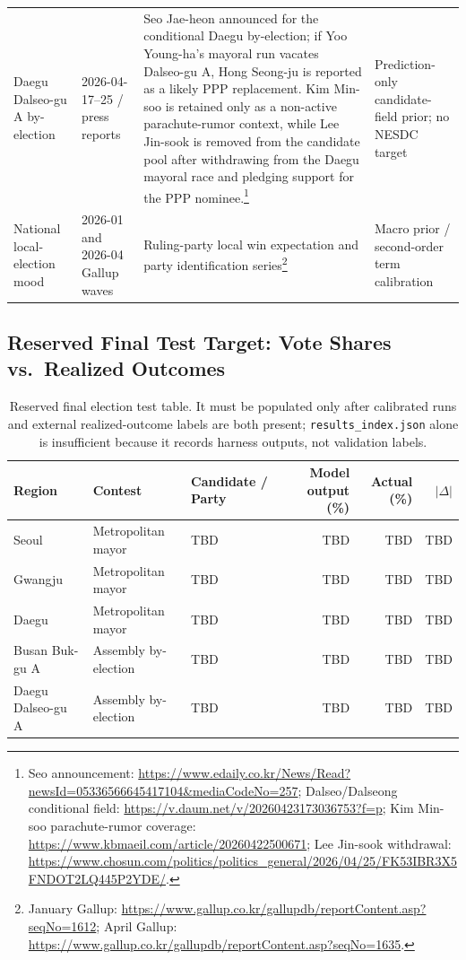 \documentclass[11pt]{article}
\begin{document}
\begin{table}[h]
\begin{tabularx}{\textwidth}{L{0.18\textwidth}L{0.18\textwidth}YL{0.16\textwidth}}
Daegu Dalseo-gu A by-election & 2026-04-17--25 / press reports & Seo Jae-heon announced for the conditional Daegu by-election; if Yoo Young-ha's mayoral run vacates Dalseo-gu A, Hong Seong-ju is reported as a likely PPP replacement. Kim Min-soo is retained only as a non-active parachute-rumor context, while Lee Jin-sook is removed from the candidate pool after withdrawing from the Daegu mayoral race and pledging support for the PPP nominee.\footnote{Seo announcement: \url{https://www.edaily.co.kr/News/Read?newsId=05336566645417104&mediaCodeNo=257}; Dalseo/Dalseong conditional field: \url{https://v.daum.net/v/20260423173036753?f=p}; Kim Min-soo parachute-rumor coverage: \url{https://www.kbmaeil.com/article/20260422500671}; Lee Jin-sook withdrawal: \url{https://www.chosun.com/politics/politics_general/2026/04/25/FK53IBR3X5FNDOT2LQ445P2YDE/}.} & Prediction-only candidate-field prior; no NESDC target \\
National local-election mood & 2026-01 and 2026-04 Gallup waves & Ruling-party local win expectation and party identification series\footnote{January Gallup: \url{https://www.gallup.co.kr/gallupdb/reportContent.asp?seqNo=1612}; April Gallup: \url{https://www.gallup.co.kr/gallupdb/reportContent.asp?seqNo=1635}.} & Macro prior / second-order term calibration \\
\bottomrule
\end{tabularx}
\end{table}

\subsection{Reserved Final Test Target: Vote Shares vs.\ Realized Outcomes}

\begin{table}[h]
\centering
\caption{Reserved final election test table. It must be populated only after calibrated runs and external realized-outcome labels are both present; \texttt{results\_index.json} alone is insufficient because it records harness outputs, not validation labels.}
\label{tab:results-vote-share}
\footnotesize
\setlength{\tabcolsep}{3pt}
\begin{tabularx}{\textwidth}{L{0.15\textwidth}L{0.18\textwidth}Yrrr}
\toprule
Region & Contest & Candidate / Party & Model output (\%) & Actual (\%) & $|\Delta|$ \\
\midrule
Seoul & Metropolitan mayor & TBD & TBD & TBD & TBD \\
Gwangju & Metropolitan mayor & TBD & TBD & TBD & TBD \\
Daegu & Metropolitan mayor & TBD & TBD & TBD & TBD \\
Busan Buk-gu A & Assembly by-election & TBD & TBD & TBD & TBD \\
Daegu Dalseo-gu A & Assembly by-election & TBD & TBD & TBD & TBD \\
\bottomrule
\end{tabularx}
\end{table}
\end{document}
